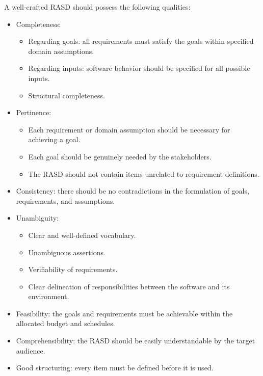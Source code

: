 \documentclass[12pt, a4paper]{report}
\begin{document}
        A well-crafted RASD should possess the following qualities:
        \begin{itemize}
            \item Completeness:
                \begin{itemize}
                    \item Regarding goals: all requirements must satisfy the goals within specified domain assumptions.
                    \item Regarding inputs: software behavior should be specified for all possible inputs.
                    \item Structural completeness. 
                \end{itemize}
            \item Pertinence: 
                \begin{itemize}
                    \item Each requirement or domain assumption should be necessary for achieving a goal.
                    \item Each goal should be genuinely needed by the stakeholders.
                    \item The RASD should not contain items unrelated to requirement definitions.
                \end{itemize}
            \item Consistency: there should be no contradictions in the formulation of goals, requirements, and assumptions.
            \item Unambiguity: 
                \begin{itemize}
                    \item Clear and well-defined vocabulary.
                    \item Unambiguous assertions. 
                    \item Verifiability of requirements.
                    \item Clear delineation of responsibilities between the software and its environment.
                \end{itemize}
            \item Feasibility: the goals and requirements must be achievable within the allocated budget and schedules.
            \item Comprehensibility: the RASD should be easily understandable by the target audience.
            \item Good structuring: every item must be defined before it is used.

\end{itemize}
\end{document}
